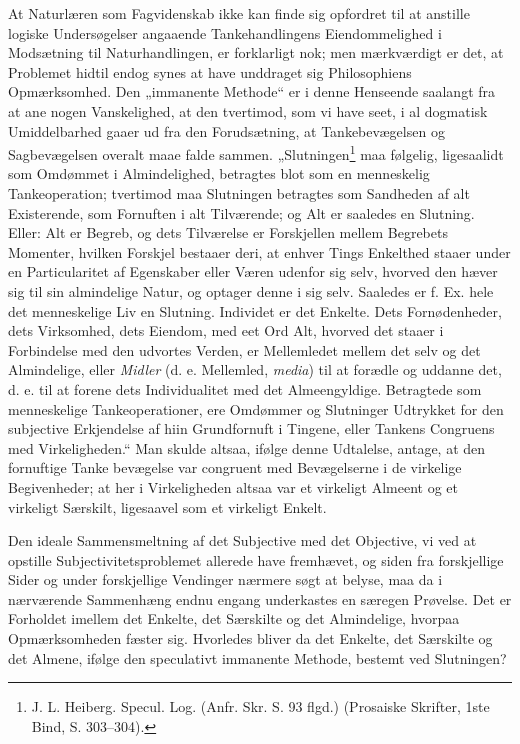 \documentclass[11pt]{book}
\newcommand{\opage}[1]{\marginnote{\footnotesize\textit{[#1]}}}
\begin{document}
At Naturlæren som Fagvidenskab ikke kan finde sig opfordret til at
anstille logiske Undersøgelser angaaende Tankehandlingens
Eiendommelighed i Modsætning til Naturhandlingen, er forklarligt nok;
men mærkværdigt er det, at Problemet hidtil endog synes at have
unddraget sig Philosophiens Opmærksomhed. Den „immanente Methode“ er i
denne Henseende saalangt fra at ane nogen Vanskelighed, at den
tvertimod, som vi have seet, i al dogmatisk Umiddelbarhed gaaer ud fra
den Forudsætning, at Tankebevægelsen og Sagbevægelsen overalt maae
falde sammen. „Slutningen\footnote{J. L. Heiberg. Specul. Log. (Anfr.
Skr. S. 93 flgd.) (Prosaiske Skrifter, 1ste Bind, S. 303--304).} maa
følgelig, ligesaalidt som Omdømmet i Almindelighed, betragtes blot som
en menneskelig Tankeoperation; tvertimod maa Slutningen betragtes som
Sandheden af alt Existerende, som Fornuften i alt Tilværende; og Alt er
saaledes en Slutning. Eller: Alt er Begreb, og dets Tilværelse er
Forskjellen mellem Begrebets Momenter, hvilken Forskjel bestaaer deri,
at enhver Tings Enkelthed staaer under en Particularitet af Egenskaber
eller Væren udenfor sig selv, hvorved den hæver sig til sin almindelige
Natur, og optager denne i sig selv. Saaledes er f. Ex. hele det
menneskelige Liv en Slutning. Individet er det Enkelte. Dets
Fornødenheder, dets Virksomhed, dets Eiendom, med eet Ord Alt, hvorved
det staaer i Forbindelse med den udvortes Verden, er Mellemledet mellem
det selv og det Almindelige, eller \emph{Midler} (d. e. Mellemled,
\textit{media}) til at forædle og uddanne det, d. e. til at forene dets
Individualitet med det Almeengyldige. Betragtede som menneskelige
Tankeoperationer, ere Omdømmer og Slutninger Udtrykket for den
subjective Erkjendelse af hiin Grundfornuft i Tingene, eller Tankens
Congruens med Virkeligheden.“ Man skulde altsaa, ifølge denne
Udtalelse, antage, at den fornuftige Tanke\-%
\opage{214} \setcounter{footnote}{0}%
bevægelse var congruent med Bevægelserne i de virkelige Begivenheder;
at her i Virkeligheden altsaa var et virkeligt Almeent og et virkeligt
Særskilt, ligesaavel som et virkeligt Enkelt.

Den ideale Sammensmeltning af det Subjective med det Objective, vi ved
at opstille Subjectivitetsproblemet allerede have fremhævet, og siden
fra forskjellige Sider og under forskjellige Vendinger nærmere søgt at
belyse, maa da i nærværende Sammenhæng endnu engang underkastes en
særegen Prøvelse. Det er Forholdet imellem det Enkelte, det Særskilte
og det Almindelige, hvorpaa Opmærksomheden fæster sig. Hvorledes bliver
da det Enkelte, det Særskilte og det Almene, ifølge den speculativt
immanente Methode, bestemt ved Slutningen?
\end{document}
